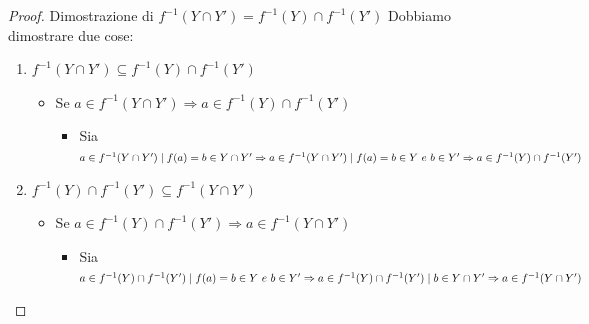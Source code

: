 \documentclass[12pt, letterpaper]{report}
\begin{document}
	\begin{proof}{Dimostrazione di $f^{-1}(Y \cap Y') {=} f^{-1}(Y) \cap f^{-1}(Y')$}
		Dobbiamo dimostrare due cose:
		\begin{enumerate}
			\item $f^{-1}(Y \cap Y') \subseteq f^{-1}(Y) \cap f^{-1}(Y')$
				\begin{itemize}
					\item Se $a \in f^{-1}(Y \cap Y') \Rightarrow a \in f^{-1}(Y) \cap f^{-1}(Y')$
					\begin{itemize}
						\item Sia $a \in f^{-1}(Y \cap Y') \mid f(a) = b \in Y \cap Y' \\ \Rightarrow a \in f^{-1}(Y \cap Y') \mid f(a) = b \in Y \ e \ b \in Y' \\ \Rightarrow a \in f^{-1}(Y) \cap f^{-1}(Y')$
					\end{itemize}
				\end{itemize}
			\item $f^{-1}(Y) \cap f^{-1}(Y') \subseteq f^{-1}(Y \cap Y')$
				\begin{itemize}
					\item Se $a \in f^{-1}(Y) \cap f^{-1}(Y') \Rightarrow a \in f^{-1}(Y \cap Y')$
					\begin{itemize}
						\item Sia $a \in f^{-1}(Y) \cap f^{-1}(Y') \mid f(a) = b \in Y \ e \ b \in Y' \\ \Rightarrow a \in f^{-1}(Y) \cap f^{-1}(Y') \mid b \in Y \cap Y' \\ \Rightarrow a \in f^{-1}(Y \cap Y')$
					\end{itemize}
				\end{itemize}
		\end{enumerate}
	\end{proof}
\end{document}
